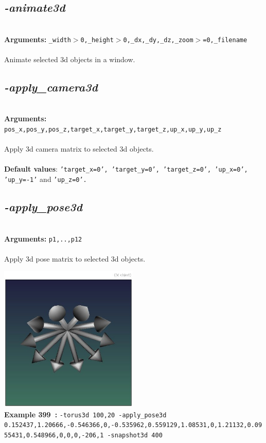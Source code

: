\documentclass[a4paper,11pt,twoside]{book}
\begin{document}
\subsection{\emph{-animate3d} }\vspace*{-0.5em}
~\\\textbf{Arguments: } 
{\small \texttt{\_width$>$0,\_height$>$0,\_dx,\_dy,\_dz,\_zoom$>$=0,\_filename}}\\~\\
Animate selected 3d objects in a window.


\subsection{\emph{-apply\_camera3d} }\vspace*{-0.5em}
~\\\textbf{Arguments: } 
{\small \texttt{pos\_x,pos\_y,pos\_z,target\_x,target\_y,target\_z,up\_x,up\_y,up\_z}}\\~\\
Apply 3d camera matrix to selected 3d objects.
~\\~\\\textbf{Default values}: {\small \texttt{'target\_x=0', 'target\_y=0', 'target\_z=0', 'up\_x=0', 'up\_y=-1'} and \texttt{'up\_z=0'.}}


\subsection{\emph{-apply\_pose3d} }\vspace*{-0.5em}
~\\\textbf{Arguments: } 
{\small \texttt{p1,..,p12}}\\~\\
Apply 3d pose matrix to selected 3d objects.
\begin{center}\includegraphics[keepaspectratio=true,height=7cm,width=\textwidth]{img/gmic_def399.jpg}\\
{\footnotesize \textbf{Example 399~:} \texttt{-torus3d 100,20 -apply\_pose3d 0.152437,1.20666,-0.546366,0,-0.535962,0.559129,1.08531,0,1.21132,0.0955431,0.548966,0,0,0,-206,1 -snapshot3d 400}}
\end{center}
\end{document}
